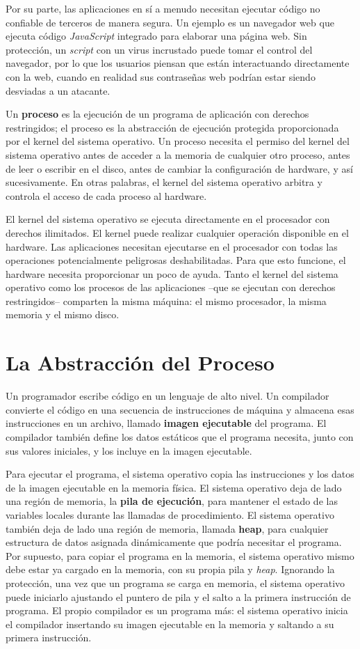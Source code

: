 \documentclass[10pt]{book}
\begin{document}
Por su parte, las aplicaciones en sí a menudo necesitan ejecutar código no confiable de terceros de manera segura. Un ejemplo es un navegador web que ejecuta código \textit{JavaScript} integrado para elaborar una página web. Sin protección, un \textit{script} con un virus incrustado puede tomar el control del navegador, por lo que los usuarios piensan que están interactuando directamente con la web, cuando en realidad sus contraseñas web podrían estar siendo desviadas a un atacante.

Un \textbf{proceso} es la ejecución de un programa de aplicación con derechos restringidos; el proceso es la abstracción de ejecución protegida proporcionada por el kernel del sistema operativo. Un proceso necesita el permiso del kernel del sistema operativo antes de acceder a la memoria de cualquier otro proceso, antes de leer o escribir en el disco, antes de cambiar la configuración de hardware, y así sucesivamente. En otras palabras, el kernel del sistema operativo arbitra y controla el acceso de cada proceso al hardware.

El kernel del sistema operativo se ejecuta directamente en el procesador con derechos ilimitados. El kernel puede realizar cualquier operación disponible en el hardware. Las aplicaciones necesitan ejecutarse en el procesador con todas las operaciones potencialmente peligrosas deshabilitadas. Para que esto funcione, el hardware necesita proporcionar un poco de ayuda. Tanto el kernel del sistema operativo como los procesos de las aplicaciones --que se ejecutan con derechos restringidos-- comparten la misma máquina: el mismo procesador, la misma memoria y el mismo disco.


\section{La Abstracción del Proceso}
Un programador escribe código en un lenguaje de alto nivel. Un compilador convierte el código en una secuencia de instrucciones de máquina y almacena esas instrucciones en un archivo, llamado \textbf{imagen ejecutable} del programa. El compilador también define los datos estáticos que el programa necesita, junto con sus valores iniciales, y los incluye en la imagen ejecutable.

Para ejecutar el programa, el sistema operativo copia las instrucciones y los datos de la imagen ejecutable en la memoria física. El sistema operativo deja de lado una región de memoria, la \textbf{pila de ejecución}, para mantener el estado de las variables locales durante las llamadas de procedimiento. El sistema operativo también deja de lado una región de memoria, llamada \textbf{heap}, para cualquier estructura de datos asignada dinámicamente que podría necesitar el programa. Por supuesto, para copiar el programa en la memoria, el sistema operativo mismo debe estar ya cargado en la memoria, con su propia pila y \textit{heap}. Ignorando la protección, una vez que un programa se carga en memoria, el sistema operativo puede iniciarlo ajustando el puntero de pila y el salto a la primera instrucción de programa. El propio compilador es un programa más: el sistema operativo inicia el compilador insertando su imagen ejecutable en la memoria y saltando a su primera instrucción.
\end{document}
